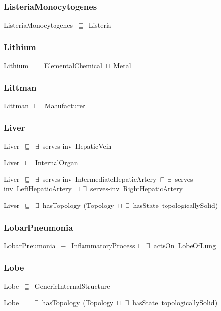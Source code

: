 \documentclass{article}
\begin{document}
\subsubsection*{ListeriaMonocytogenes}

ListeriaMonocytogenes~\ensuremath{\sqsubseteq}~Listeria~

\subsubsection*{Lithium}

Lithium~\ensuremath{\sqsubseteq}~ElementalChemical~\ensuremath{\sqcap}~Metal~

\subsubsection*{Littman}

Littman~\ensuremath{\sqsubseteq}~Manufacturer~

\subsubsection*{Liver}

Liver~\ensuremath{\sqsubseteq}~\ensuremath{\exists}~serves-inv~HepaticVein~

Liver~\ensuremath{\sqsubseteq}~InternalOrgan~

Liver~\ensuremath{\sqsubseteq}~\ensuremath{\exists}~serves-inv~IntermediateHepaticArtery~\ensuremath{\sqcap}~\ensuremath{\exists}~serves-inv~LeftHepaticArtery~\ensuremath{\sqcap}~\ensuremath{\exists}~serves-inv~RightHepaticArtery~

Liver~\ensuremath{\sqsubseteq}~\ensuremath{\exists}~hasTopology~(Topology~\ensuremath{\sqcap}~\ensuremath{\exists}~hasState~topologicallySolid)~

\subsubsection*{LobarPneumonia}

LobarPneumonia~\ensuremath{\equiv}~InflammatoryProcess~\ensuremath{\sqcap}~\ensuremath{\exists}~actsOn~LobeOfLung

\subsubsection*{Lobe}

Lobe~\ensuremath{\sqsubseteq}~GenericInternalStructure~

Lobe~\ensuremath{\sqsubseteq}~\ensuremath{\exists}~hasTopology~(Topology~\ensuremath{\sqcap}~\ensuremath{\exists}~hasState~topologicallySolid)~
\end{document}
